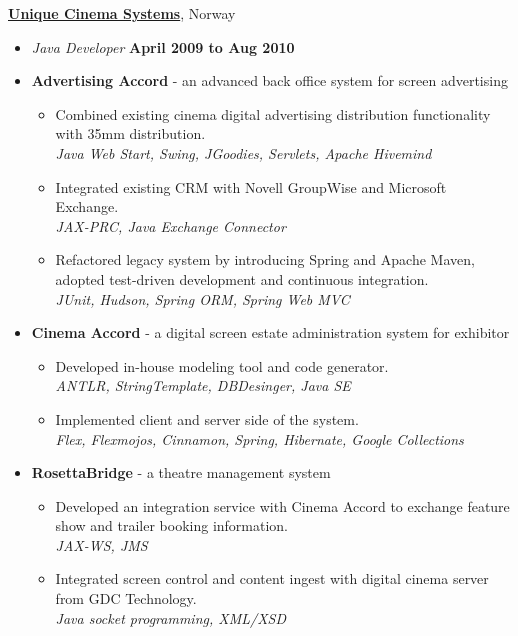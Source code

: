 \documentclass[10pt]{article}
\newenvironment{outerlist}[1][\enskip\textbullet]%
        {\begin{itemize}[#1]}{\end{itemize}%
         \vspace{-.6\baselineskip}}
\newcommand{\blankline}{\quad\pagebreak[2]}
\begin{document}
%
\href{http://www.uniquedigitalcinema.com/}{\textbf{Unique Cinema Systems}}, {Norway}
\begin{outerlist}

\item[] \textit{Java Developer}%
        \hfill \textbf{April 2009 to Aug 2010}
\item[] {\textbf{Advertising Accord} - an advanced back office system for screen advertising}
\begin{outerlist}
\item Combined existing cinema digital advertising distribution functionality with 35mm distribution.\\
\textit {Java Web Start, Swing, JGoodies, Servlets, Apache Hivemind}
\item Integrated existing CRM with Novell GroupWise and Microsoft Exchange.\\
\textit {JAX-PRC, Java Exchange Connector}
\item Refactored legacy system by introducing Spring and Apache Maven, adopted test-driven development and continuous integration.\\
\textit {JUnit, Hudson, Spring ORM, Spring Web MVC}
\end{outerlist}

\item[] {\textbf{Cinema Accord} - a digital screen estate administration system for exhibitor}
\begin{outerlist}
\item Developed in-house modeling tool and code generator.\\
\textit {ANTLR, StringTemplate, DBDesinger, Java SE}
\item Implemented client and server side of the system.\\
\textit {Flex, Flexmojos, Cinnamon, Spring, Hibernate, Google Collections}
\end{outerlist}

\item[] {\textbf{RosettaBridge} - a theatre management system}
\begin{outerlist}
\item Developed an integration service with Cinema Accord to exchange feature show and trailer booking information.\\
\textit {JAX-WS, JMS}
\item Integrated screen control and content ingest with digital cinema server from GDC Technology.\\
\textit {Java socket programming, XML/XSD}
\end{outerlist}

\end{outerlist}
\blankline
\end{document}
